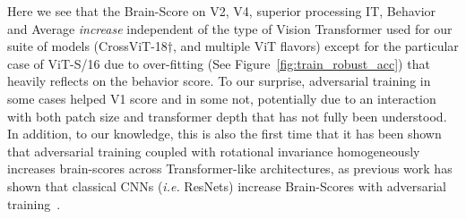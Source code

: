 \documentclass{article} %
\begin{document}
Here we see that the Brain-Score on V2, V4, superior processing IT, Behavior and Average \textit{increase} independent of the type of Vision Transformer used for our suite of models (CrossViT-18$\dagger$, and multiple ViT flavors) except for the particular case of ViT-S/16 due to over-fitting (See Figure~\ref{fig:train_robust_acc}) that heavily reflects on the behavior score. To our surprise, adversarial training in some cases helped V1 score and in some not, potentially due to an interaction with both patch size and transformer depth that has not fully been understood. In addition, to our knowledge, this is also the first time that it has been shown that adversarial training coupled with rotational invariance homogeneously increases brain-scores across Transformer-like architectures, as previous work has shown that classical CNNs (\textit{i.e.} ResNets) increase Brain-Scores with adversarial training~\citep{dapello2020simulating}. 
\end{document}
